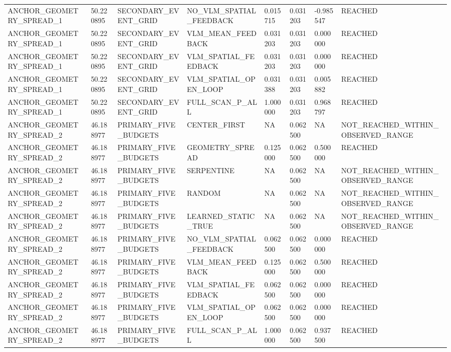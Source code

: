 \begin{tabular}{llllllll}
ANCHOR\_GEOMETRY\_SPREAD\_1 & 50.220895 & SECONDARY\_EVENT\_GRID & NO\_VLM\_SPATIAL\_FEEDBACK & 0.015715 & 0.031203 & -0.985547 & REACHED \\
ANCHOR\_GEOMETRY\_SPREAD\_1 & 50.220895 & SECONDARY\_EVENT\_GRID & VLM\_MEAN\_FEEDBACK & 0.031203 & 0.031203 & 0.000000 & REACHED \\
ANCHOR\_GEOMETRY\_SPREAD\_1 & 50.220895 & SECONDARY\_EVENT\_GRID & VLM\_SPATIAL\_FEEDBACK & 0.031203 & 0.031203 & 0.000000 & REACHED \\
ANCHOR\_GEOMETRY\_SPREAD\_1 & 50.220895 & SECONDARY\_EVENT\_GRID & VLM\_SPATIAL\_OPEN\_LOOP & 0.031388 & 0.031203 & 0.005882 & REACHED \\
ANCHOR\_GEOMETRY\_SPREAD\_1 & 50.220895 & SECONDARY\_EVENT\_GRID & FULL\_SCAN\_P\_ALL & 1.000000 & 0.031203 & 0.968797 & REACHED \\
ANCHOR\_GEOMETRY\_SPREAD\_2 & 46.188977 & PRIMARY\_FIVE\_BUDGETS & CENTER\_FIRST & NA & 0.062500 & NA & NOT\_REACHED\_WITHIN\_OBSERVED\_RANGE \\
ANCHOR\_GEOMETRY\_SPREAD\_2 & 46.188977 & PRIMARY\_FIVE\_BUDGETS & GEOMETRY\_SPREAD & 0.125000 & 0.062500 & 0.500000 & REACHED \\
ANCHOR\_GEOMETRY\_SPREAD\_2 & 46.188977 & PRIMARY\_FIVE\_BUDGETS & SERPENTINE & NA & 0.062500 & NA & NOT\_REACHED\_WITHIN\_OBSERVED\_RANGE \\
ANCHOR\_GEOMETRY\_SPREAD\_2 & 46.188977 & PRIMARY\_FIVE\_BUDGETS & RANDOM & NA & 0.062500 & NA & NOT\_REACHED\_WITHIN\_OBSERVED\_RANGE \\
ANCHOR\_GEOMETRY\_SPREAD\_2 & 46.188977 & PRIMARY\_FIVE\_BUDGETS & LEARNED\_STATIC\_TRUE & NA & 0.062500 & NA & NOT\_REACHED\_WITHIN\_OBSERVED\_RANGE \\
ANCHOR\_GEOMETRY\_SPREAD\_2 & 46.188977 & PRIMARY\_FIVE\_BUDGETS & NO\_VLM\_SPATIAL\_FEEDBACK & 0.062500 & 0.062500 & 0.000000 & REACHED \\
ANCHOR\_GEOMETRY\_SPREAD\_2 & 46.188977 & PRIMARY\_FIVE\_BUDGETS & VLM\_MEAN\_FEEDBACK & 0.125000 & 0.062500 & 0.500000 & REACHED \\
ANCHOR\_GEOMETRY\_SPREAD\_2 & 46.188977 & PRIMARY\_FIVE\_BUDGETS & VLM\_SPATIAL\_FEEDBACK & 0.062500 & 0.062500 & 0.000000 & REACHED \\
ANCHOR\_GEOMETRY\_SPREAD\_2 & 46.188977 & PRIMARY\_FIVE\_BUDGETS & VLM\_SPATIAL\_OPEN\_LOOP & 0.062500 & 0.062500 & 0.000000 & REACHED \\
ANCHOR\_GEOMETRY\_SPREAD\_2 & 46.188977 & PRIMARY\_FIVE\_BUDGETS & FULL\_SCAN\_P\_ALL & 1.000000 & 0.062500 & 0.937500 & REACHED \\

\end{tabular}
